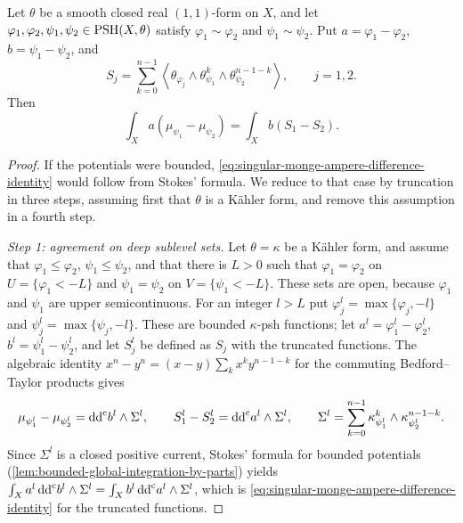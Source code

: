 \begin{lemma}\label{lem:singular-monge-ampere-difference-identity}
Let $\theta$ be a smooth closed real $(1,1)$-form on $X$, and let $\varphi_1,\varphi_2,\psi_1,\psi_2\in\mathrm{PSH}(X,\theta)$ satisfy $\varphi_1\sim\varphi_2$ and $\psi_1\sim\psi_2$. Put $a=\varphi_1-\varphi_2$, $b=\psi_1-\psi_2$, and
\[
 S_j=\sum_{k=0}^{n-1}
       \left\langle\theta_{\varphi_j}\wedge\theta_{\psi_1}^{k}
                                      \wedge\theta_{\psi_2}^{n-1-k}\right\rangle,
       \qquad j=1,2.
\]
Then
\begin{equation}\label{eq:singular-monge-ampere-difference-identity}
 \int_Xa(\mu_{\psi_1}-\mu_{\psi_2})
                         =\int_Xb(S_1-S_2).
\end{equation}
\end{lemma}
\begin{proof}
If the potentials were bounded, \eqref{eq:singular-monge-ampere-difference-identity} would follow from Stokes' formula. We reduce to that case by truncation in three steps, assuming first that $\theta$ is a K\"ahler form, and remove this assumption in a fourth step.

\emph{Step 1: agreement on deep sublevel sets.} Let $\theta=\kappa$ be a K\"ahler form, and assume that $\varphi_1\leq\varphi_2$, $\psi_1\leq\psi_2$, and that there is $L>0$ such that $\varphi_1=\varphi_2$ on $U=\{\varphi_1<-L\}$ and $\psi_1=\psi_2$ on $V=\{\psi_1<-L\}$. These sets are open, because $\varphi_1$ and $\psi_1$ are upper semicontinuous. For an integer $l>L$ put $\varphi_j^l=\max\{\varphi_j,-l\}$ and $\psi_j^l=\max\{\psi_j,-l\}$. These are bounded $\kappa$-psh functions; let $a^l=\varphi_1^l-\varphi_2^l$, $b^l=\psi_1^l-\psi_2^l$, and let $S_j^l$ be defined as $S_j$ with the truncated functions. The algebraic identity $x^n-y^n=(x-y)\sum_kx^ky^{n-1-k}$ for the commuting Bedford--Taylor products gives
\[
 \mu_{\psi_1^l}-\mu_{\psi_2^l}=\mathrm{dd}^{\mathrm{c}} b^l\wedge\Sigma^l,\qquad
 S_1^l-S_2^l=\mathrm{dd}^{\mathrm{c}} a^l\wedge\Sigma^l,\qquad
 \Sigma^l=\sum_{k=0}^{n-1}\kappa_{\psi_1^l}^k\wedge\kappa_{\psi_2^l}^{n-1-k}.
\]
Since $\Sigma^l$ is a closed positive current, Stokes' formula for bounded potentials (\cref{lem:bounded-global-integration-by-parts}) yields $\int_Xa^l\,\mathrm{dd}^{\mathrm{c}} b^l\wedge\Sigma^l=\int_Xb^l\,\mathrm{dd}^{\mathrm{c}} a^l\wedge\Sigma^l$, which is \eqref{eq:singular-monge-ampere-difference-identity} for the truncated functions.


\end{proof}
